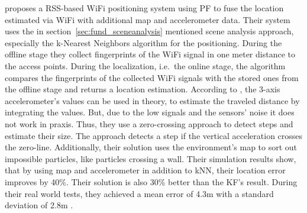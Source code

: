 \citet{wang:wlan} proposes a \ac{RSS}-based WiFi positioning system using \ac{PF} to fuse the location estimated via WiFi with additional map and accelerometer data. Their system uses the in section~\ref{sec:fund_sceneanalysis} mentioned scene analysis approach, especially the k-Nearest Neighbors algorithm for the positioning. During the offline stage they collect fingerprints of the WiFi signal in one meter distance to the access points. During the localization, i.e.\ the online stage, the algorithm compares the fingerprints of the collected WiFi signals with the stored ones from the offline stage and returns a location estimation. According to \citet{wang:wlan}, the 3-axis accelerometer's values can be used in theory, to estimate the traveled distance by integrating the values. But, due to the low signals and the sensors' noise it does not work in praxis. Thus, they use a zero-crossing approach to detect steps and estimate their size. The approach detects a step if the vertical acceleration crosses the zero-line. Additionally, their solution uses the environment's map to sort out impossible particles, like particles crossing a wall.
Their simulation results show, that by using map and accelerometer in addition to kNN, their location error improves by 40\%. Their solution is also 30\% better than the \ac{KF}'s result. During their real world tests, they achieved a mean error of 4.3m with a standard deviation of 2.8m \citep{wang:wlan}.

